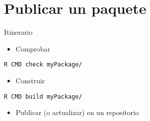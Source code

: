 \documentclass[xcolor={usenames,svgnames,dvipsnames}]{beamer}
\begin{document}
\section{Publicar un paquete}
\label{sec:org11ef8f3}

\begin{frame}[fragile,label={sec:orgad905ca}]{Itinerario}
 \begin{itemize}
\item Comprobar
\end{itemize}
\begin{verbatim}
R CMD check myPackage/
\end{verbatim}
\begin{itemize}
\item Construir
\end{itemize}
\begin{verbatim}
R CMD build myPackage/
\end{verbatim}
\begin{itemize}
\item Publicar (o actualizar) en un repositorio
\end{itemize}
\end{frame}
\end{document}
